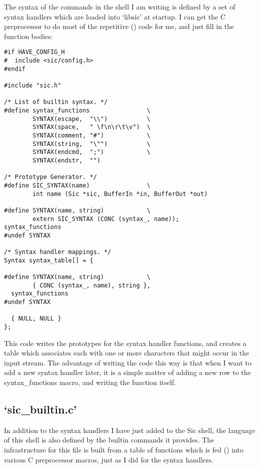 The syntax of the commands in the shell I am writing is defined by a set of 
syntax handlers which are loaded into `libsic' at startup. I can get the C 
preprocessor to do most of the repetitive ({\McQ{}}) code for me, and just fill 
in the function bodies: 

\begin{Verbatim}[frame=single]
#if HAVE_CONFIG_H
#  include <sic/config.h>
#endif

#include "sic.h"

/* List of builtin syntax. */
#define syntax_functions                \
        SYNTAX(escape,  "\\")           \
        SYNTAX(space,   " \f\n\r\t\v")  \
        SYNTAX(comment, "#")            \
        SYNTAX(string,  "\"")           \
        SYNTAX(endcmd,  ";")            \
        SYNTAX(endstr,  "")

/* Prototype Generator. */
#define SIC_SYNTAX(name)                \
        int name (Sic *sic, BufferIn *in, BufferOut *out)

#define SYNTAX(name, string)            \
        extern SIC_SYNTAX (CONC (syntax_, name));
syntax_functions
#undef SYNTAX

/* Syntax handler mappings. */
Syntax syntax_table[] = {

#define SYNTAX(name, string)            \
        { CONC (syntax_, name), string },
  syntax_functions
#undef SYNTAX
  
  { NULL, NULL }
};
\end{Verbatim}

This code writes the prototypes for the syntax handler functions, and creates 
a table which associates each with one or more characters that might occur in 
the input stream. The advantage of writing the code this way is that when I 
want to add a new syntax handler later, it is a simple matter of adding a new 
row to the syntax\_{}functions macro, and writing the function itself. 

\subsection{`sic\_{}builtin.c'}


In addition to the syntax handlers I have just added to the Sic shell, the 
language of this shell is also defined by the builtin commands it provides.
The infrastructure for this file is built from a table of functions which is 
fed ({\MuQ\cH3}) into various C preprocessor macros, just as I did for the syntax 
handlers. 


